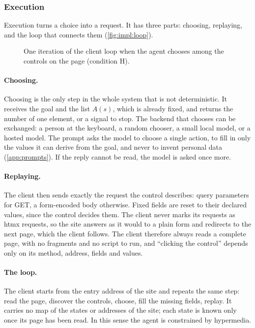 \subsubsection{Execution}\label{sec:impl:agent}

Execution turns a choice into a request.
It has three parts: choosing, replaying, and the loop that connects them (\autoref{fig:impl:loop}).

\begin{figure}[htbp]
\centering

\caption{One iteration of the client loop when the agent chooses among the controls on the page (condition H).}
\label{fig:impl:loop}
\end{figure}

\paragraph{Choosing.}
Choosing is the only step in the whole system that is not deterministic.
It receives the goal and the list $A(s)$, which is already fixed, and returns the number of one element, or a signal to stop.
The backend that chooses can be exchanged: a person at the keyboard, a random chooser, a small local model, or a hosted model.
The prompt asks the model to choose a single action, to fill in only the values it can derive from the goal, and never to invent personal data (\autoref{app:prompts}).
If the reply cannot be read, the model is asked once more.

\paragraph{Replaying.}
The client then sends exactly the request the control describes: query parameters for GET, a form-encoded body otherwise.
Fixed fields are reset to their declared values, since the control decides them.
The client never marks its requests as htmx requests, so the site answers as it would to a plain form and redirects to the next page, which the client follows.
The client therefore always reads a complete page, with no fragments and no script to run, and ``clicking the control'' depends only on its method, address, fields and values.

\paragraph{The loop.}
The client starts from the entry address of the site and repeats the same step: read the page, discover the controls, choose, fill the missing fields, replay.
It carries no map of the states or addresses of the site; each state is known only once its page has been read.
In this sense the agent is constrained by hypermedia.

